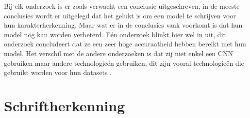 Bij elk onderzoek is er zoals verwacht een conclusie uitgeschreven, in de meeste conclusies wordt er uitgelegd dat het gelukt is om een model te schrijven voor hun karakterherkenning.
Maar wat er in de conclusies vaak voorkomt is dat hun model nog kan worden verbeterd.
Eén onderzoek blinkt hier wel in uit, dit onderzoek concludeert dat ze een zeer hoge accuraatheid hebben bereikt met hun model. Het verschil met de andere onderzoeken is dat zij niet enkel een CNN gebruiken maar andere technologieën gebruiken, dit zijn vooral technologieën die gebruikt worden voor hun datasets \autocite{Yann}.

\section{Schriftherkenning}



















